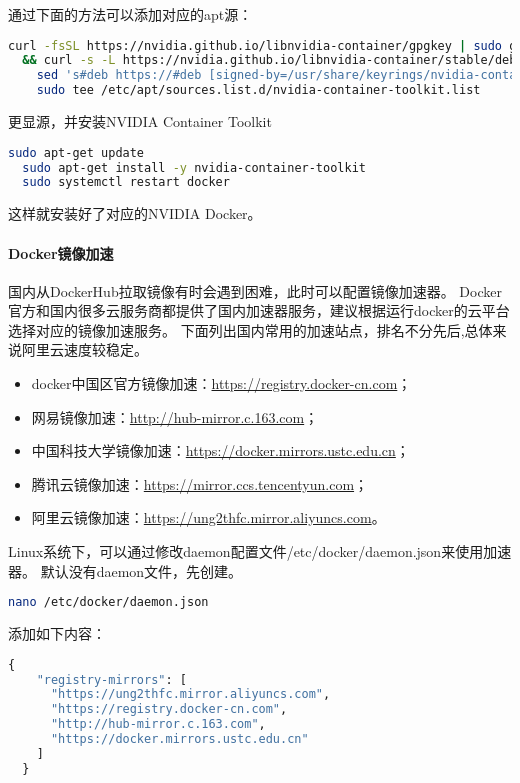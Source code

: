 \documentclass[lang=cn,a4paper,newtx]{elegantpaper}
\begin{document}
通过下面的方法可以添加对应的apt源：
\begin{lstlisting}[language=bash]
  curl -fsSL https://nvidia.github.io/libnvidia-container/gpgkey | sudo gpg --dearmor -o /usr/share/keyrings/nvidia-container-toolkit-keyring.gpg \
  && curl -s -L https://nvidia.github.io/libnvidia-container/stable/deb/nvidia-container-toolkit.list | \
    sed 's#deb https://#deb [signed-by=/usr/share/keyrings/nvidia-container-toolkit-keyring.gpg] https://#g' | \
    sudo tee /etc/apt/sources.list.d/nvidia-container-toolkit.list
\end{lstlisting}

更显源，并安装NVIDIA Container Toolkit
\begin{lstlisting}[language=bash]
  sudo apt-get update
  sudo apt-get install -y nvidia-container-toolkit
  sudo systemctl restart docker
\end{lstlisting}

这样就安装好了对应的NVIDIA Docker。


\paragraph{Docker镜像加速}
国内从DockerHub拉取镜像有时会遇到困难，此时可以配置镜像加速器。
Docker官方和国内很多云服务商都提供了国内加速器服务，建议根据运行docker的云平台选择对应的镜像加速服务。
下面列出国内常用的加速站点，排名不分先后,总体来说阿里云速度较稳定。
\begin{itemize}
  \item docker中国区官方镜像加速：\url{https://registry.docker-cn.com}；
  \item 网易镜像加速：\url{http://hub-mirror.c.163.com}；
  \item 中国科技大学镜像加速：\url{https://docker.mirrors.ustc.edu.cn}；
  \item 腾讯云镜像加速：\url{https://mirror.ccs.tencentyun.com}；
  \item 阿里云镜像加速：\url{https://ung2thfc.mirror.aliyuncs.com}。
\end{itemize}

Linux系统下，可以通过修改daemon配置文件/etc/docker/daemon.json来使用加速器。
默认没有daemon文件，先创建。
\begin{lstlisting}[language=bash]
nano /etc/docker/daemon.json
\end{lstlisting}

添加如下内容：
\begin{lstlisting}[language=python]
  {
    "registry-mirrors": [
      "https://ung2thfc.mirror.aliyuncs.com",
      "https://registry.docker-cn.com",
      "http://hub-mirror.c.163.com",
      "https://docker.mirrors.ustc.edu.cn"
    ]
  }
\end{lstlisting}
\end{document}

